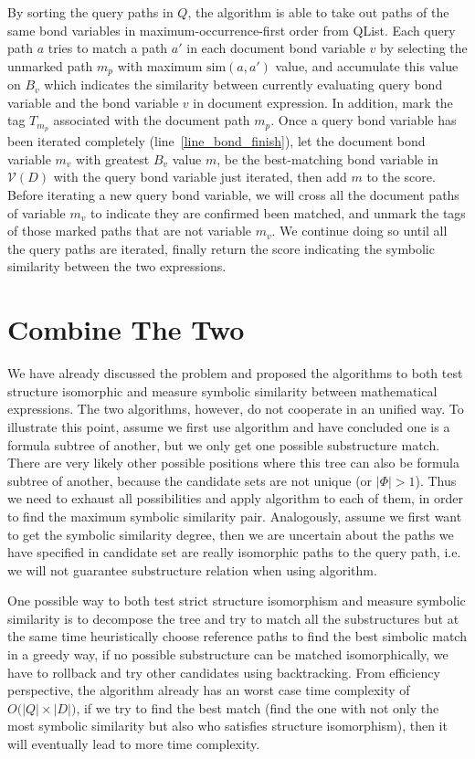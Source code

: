 By sorting the query paths in $Q$, the algorithm is able to take out paths of the same bond variables in maximum-occurrence-first order from QList. 
Each query path $a$ tries to match a path $a'$ in each document bond variable $v$ by selecting the unmarked path $m_p$ with maximum $\mathrm{sim}(a,a')$ value, and accumulate this value on $B_v$ which indicates the similarity between currently evaluating query bond variable and the bond variable $v$ in document expression.
In addition, mark the tag $T_{m_p}$ associated with the document path $m_p$.
Once a query bond variable has been iterated completely (line~\ref{line_bond_finish}),
let the document bond variable $m_v$ with greatest $B_v$ value $m$, be the best-matching bond variable in $\mathcal{V}(D)$ with the query bond variable just iterated, then add $m$ to the score.
Before iterating a new query bond variable, we will cross all the document paths of variable $m_v$ to indicate they are confirmed been matched, 
and unmark the tags of those marked paths that are not variable $m_v$.
We continue doing so until all the query paths are iterated, finally return the score indicating the symbolic similarity between the two expressions.

\section{Combine The Two}
\label{CombineTheTwo}
We have already discussed the problem and proposed the algorithms to both test structure isomorphic and measure symbolic similarity between mathematical expressions. The two algorithms, however, do not cooperate in an unified way. 
To illustrate this point, assume we first use  algorithm and have concluded one is a formula subtree of another, but we only get one possible substructure match. 
There are very likely other possible positions where this tree can also be formula subtree of another, because the candidate sets are not unique (or $|\Phi| > 1$). 
Thus we need to exhaust all possibilities and apply  algorithm to each of them, in order to find the maximum symbolic similarity pair. 
Analogously, assume we first want to get the symbolic similarity degree, then we are uncertain about the paths we have specified in candidate set are really isomorphic paths to the query path, i.e. we will not guarantee substructure relation when using  algorithm.

One possible way to both test strict structure isomorphism and measure symbolic similarity is to decompose the tree and try to match all the substructures but at the same time heuristically choose reference paths to find the best simbolic match in a greedy way, if no possible substructure can be matched isomorphically, we have to rollback and try other candidates using backtracking.
From efficiency perspective, the  algorithm already has an worst case time complexity of $O\big(|Q| \times |D|\big)$, if we try to find the best match (find the one with not only the most symbolic similarity but also who satisfies structure isomorphism), then it will eventually lead to more time complexity.

